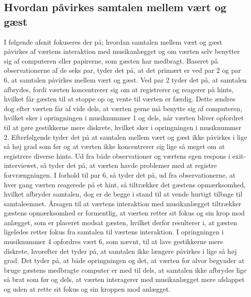 \subsection{Hvordan påvirkes samtalen mellem vært og gæst}
\label{TestresultaterSocialAcceptSamtale}
%
I følgende afsnit fokuseres der på; hvordan samtalen mellem vært og gæst påvirkes af værtens interaktion med musikanlægget og om værten selv benytter sig af computeren eller papirerne, som gæsten har medbragt. \blankline
%
Baseret på observationerne af de seks par, tyder det på, at det primært er ved par 2 og par 6, at samtalen påvirkes mellem vært og gæst. Ved par 2 tyder det på, at samtalen afbrydes, fordi værten koncentrerer sig om at registrerer og reagerer på hints, hvilket får gæsten til at stoppe op og vente til værten er færdig. Dette ændres dog efter værten får af vide dels, at værten gerne må benytte sig af computeren, hvilket sker i opringningen i musiknummer 1 og dels, når værten bliver opfordret til at gøre gestikkerne mere diskrete, hvilket sker i opringningen i musiknummer 2. Efterfølgende tyder det på at samtalen mellem vært og gæst ikke påvirkes i lige så høj grad som før og at værten ikke koncentrerer sig lige så meget om at registrere diverse hints. Ud fra både observationer og værtens egen respons i exit-interviewet, så tyder det på, at værten havde problemer med at registre forvrængningen. I forhold til par 6, så tyder det på, ud fra observationerne, at hver gang værten reagerede på et hint, så tiltrækker det gæstens opmærksomhed, hvilket afbryder samtalen, dog er de begge i stand til at vende hurtigt tilbage til samtaleemnet. Årsagen til at værtens interaktion med musikanlægget tiltrækker gæstens opmærksomhed er formentlig, at værten retter sit fokus og sin krop mod anlægget, som er placeret modsat gæsten, hvilket derfor resulterer i, at gæsten ligeledes retter fokus fra samtalen til værtens interaktion. I opringningen i musiknummer 4 opfordres vært 6, som nævnt, til at lave gestikkerne mere diskrete, hvorefter det tyder på, at samtalen ikke længere påvirkes i lige så høj grad. Det tyder på, at både opringningen og det, at værten for alvor begynder at bruge gæstens medbragte computer er med til dels, at samtalen ikke afbrydes lige så brat som før og dels, at værten interagerer med musikanlægget mere afslappet og uden at rette sit fokus og sin kroppen mod anlægget.


